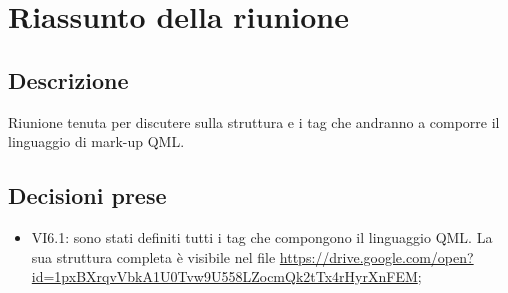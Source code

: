 \section{Riassunto della riunione}
\subsection{Descrizione}

Riunione tenuta per discutere sulla struttura e i tag che andranno a comporre il linguaggio di mark-up QML.

\subsection{Decisioni prese}
\begin{itemize}
\item VI6.1: sono stati definiti tutti i tag che compongono il linguaggio QML. La sua struttura completa è visibile nel file \url{https://drive.google.com/open?id=1pxBXrqvVbkA1U0Tvw9U558LZocmQk2tTx4rHyrXnFEM};
\end{itemize}
